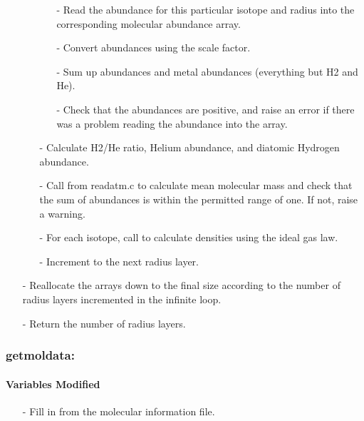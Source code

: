 \documentclass[letterpaper,12pt]{article}
\begin{document}
\begin{enumerate}[leftmargin=10pt, noitemsep, parsep=0pt, topsep=0ex]
\begin{enumerate}[leftmargin=10pt, noitemsep, parsep=0pt, topsep=0ex]
\begin{enumerate}[leftmargin=10pt, noitemsep, parsep=0pt, topsep=0ex]
\item[-] Read the abundance for this particular isotope and radius into the corresponding molecular abundance array.
\item[-] Convert abundances using the scale factor.
\item[-] Sum up abundances and metal abundances (everything but H2 and He).
\item[-] Check that the abundances are positive, and raise an error if there was a problem reading the abundance into the array.
\end{enumerate}
\item[-] Calculate H2/He ratio, Helium abundance, and diatomic Hydrogen abundance.
\item[-] Call  from readatm.c to calculate mean molecular mass and check that the sum of abundances is within the permitted range of one. If not, raise a warning.
\item[-] For each isotope, call   to calculate densities using the ideal gas law.
\item[-] Increment to the next radius layer.
\end{enumerate}
\item[-] Reallocate the arrays down to the final size according to the number of radius layers incremented in the infinite loop.
\item[-] Return the number of radius layers.
\end{enumerate}

\subsubsection{getmoldata:}
\paragraph{Variables Modified}
\begin{enumerate}[leftmargin=10pt, noitemsep, parsep=0pt, topsep=0ex]
\item[-] Fill in  from the molecular information file.
\end{enumerate}
\end{document}
